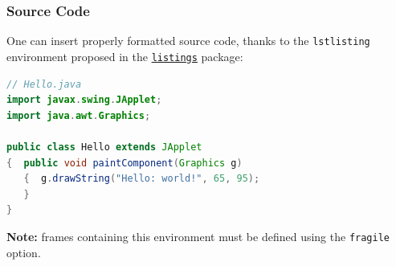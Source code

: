 \documentclass[10pt,    %
    english,            %
    xcolor=table,       %
    envcountsect,       %
    aspectratio=43      %
]{beamer}
\begin{document}
\begin{frame}[fragile]
    \frametitle{Source Code}
    \label{frm:sourcecode}
    
    One can insert properly formatted source code, thanks to the \texttt{lstlisting} environment proposed in the \href{https://ctan.org/pkg/listings?lang=en}{\texttt{listings}} package:
    
    \begin{lstlisting}[language=Java,caption={Hello World Java applet.},captionpos=b,label={lst:hello}]
// Hello.java
import javax.swing.JApplet;
import java.awt.Graphics;

public class Hello extends JApplet
{  public void paintComponent(Graphics g) 
   {  g.drawString("Hello: world!", 65, 95);
   }    
}
    \end{lstlisting}
    
    \textbf{Note:} frames containing this environment must be defined using the \texttt{fragile} option.
    
    
\end{frame}
\end{document}
